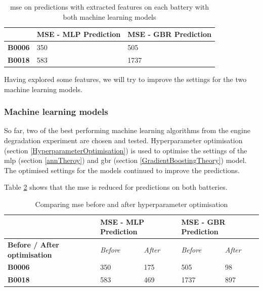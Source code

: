 \documentclass[english, a4paper]{report}
\begin{document}
{{{{                \begin{table}[H]
                    \centering
                    \begin{tabular}{|l|l|l|}
                        \hline
                         & \textbf{MSE - MLP Prediction} & \textbf{MSE - GBR Prediction} \\ \hline
                        \textbf{B0006} & 350 & 505 \\ \hline
                        \textbf{B0018} & 583 & 1737 \\ \hline
                    \end{tabular}
                    \caption{\gls{mse} on predictions with extracted features on each battery with both machine learning models}
                    \label{BatteryPredSimple2}
                \end{table}
                
                Having explored some features, we will try to improve the settings for the two machine learning models.
            }
            
            \subsubsection{Machine learning models}
            {
                So far, two of the best performing machine learning algorithms from the engine degradation experiment are chosen and tested. Hyperparameter optimisation (section \ref{HyperparameterOptimisation}) is used to optimise the settings of the \gls{mlp} (section \ref{annTheroy}) and \gls{gbr} (section \ref{GradientBoostingTheory}) model. The optimised settings for the models continued to improve the predictions. 
                \par
                Table \ref{MSEBeforeAndAfterOpti} shows that the \gls{mse} is reduced for predictions on both batteries. 
            
                \begin{table}[H]
                    \centering
                    \begin{tabular}{|l|l|l|l|l|}
                        \hline
                         & \multicolumn{2}{l|}{\textbf{MSE - MLP Prediction}} & \multicolumn{2}{l|}{\textbf{MSE - GBR Prediction}} \\ \hline
                        \textbf{Before / After optimisation} & {\textit{Before}} & {\textit{After}} & {\textit{Before}} & {\textit{After}} \\ \hline
                        \textbf{B0006} & 350 & 175 & 505 & 98 \\ \hline
                        \textbf{B0018} & 583 & 469 & 1737 & 897 \\ \hline
                    \end{tabular}
                    \caption{Comparing \gls{mse} before and after hyperparameter optimisation}
                    \label{MSEBeforeAndAfterOpti}
                \end{table}
                
}}}}
\end{document}
